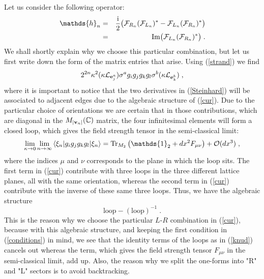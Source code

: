 \documentclass[12pt]{article}
\newcommand{\nn}{\nonumber}
\def\m{\mu}
\def\n{\nu}
\def\cf{{\cal F}}
\def\cl{{\cal L}}
\def\co{{\cal O}}
\begin{document}
Let us consider the following operator:
\begin{eqnarray}
\mathds{h}_n &=&  \frac{\mathrm{i}}{2} \big( \cf_{R_n} (\cf_{L_n})^*  -  \cf_{L_n} (\cf_{R_n} )^*\big) \nn\\
&=& \mbox{Im}\big( \cf_{L_n} (\cf_{R_n} )^* \big) \;.
\label{cur}
\end{eqnarray}
We shall shortly explain why we choose this particular combination, but let us first write down the form of the matrix entries that arise.
Using (\ref{strand}) we find
\begin{equation}
 2^{2n}\kappa^2 (\kappa\cl_{{\bf e}_j^a})  \sigma^a  g_i g_j   g_k g_l \sigma^b  (\kappa \cl_{{\bf e}_k^b}) \;,
\label{Steinhard}
\end{equation}
where it is important to notice that the two derivatives in (\ref{Steinhard}) will be associated to adjacent edges due to the algebraic structure of (\ref{cur}).  Due to the particular choice of orientations we are certain that in those contributions, which are diagonal in the $M_{\vert {\bf v}_n\vert}(\mathbb{C})$ matrix, the four infinitesimal elements will form a closed loop, which gives the field strength tensor in the semi-classical limit:
\begin{eqnarray}
 \lim_{\kappa\rightarrow 0} \lim_{n\rightarrow\infty}\left\langle \xi_{n} \vert   g_i g_j   g_k g_l 
     \vert \xi_{n} \right\rangle = \mbox{Tr}_{M_2}
     \left(
  \mathds{1}_2 + dx^2 F_{\m\n} \right) + \co(dx^3)\;,
\label{knud}
\end{eqnarray}
where the indices $\m$ and $\n$ corresponds to the plane in which the loop sits.
The first term in (\ref{cur}) contribute with three loops in the three different lattice planes, all with the same orientation, whereas the second term in (\ref{cur}) contribute with the inverse of these same three loops. Thus, we have the algebraic structure 
$$\mbox{loop} - (\mbox{loop})^{-1}\;.$$
This is the reason why we choose the particular $L$-$R$ combination in (\ref{cur}), because with this algebraic structure, and keeping the first condition in (\ref{conditions}) in mind, we see that the identity terms of the loops as in (\ref{knud}) cancels out whereas the term, which gives the field strength tensor $F_{\m\n}$ in the semi-classical limit, add up. Also, the reason why we split the one-forms into "R" and "L" sectors is to avoid backtracking. %
\end{document}
